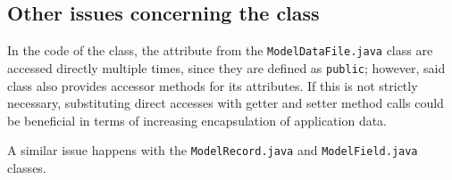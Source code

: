 
\subsection{Other issues concerning the class}
In the code of the class, the attribute from the \texttt{ModelDataFile.java} class are accessed directly multiple times, since they are defined as \texttt{public}; however, said class also provides accessor methods for its attributes. If this is not strictly necessary, substituting direct accesses with getter and setter method calls could be beneficial in terms of increasing encapsulation of application data.

A similar issue happens with the \texttt{ModelRecord.java} and \texttt{ModelField.java} classes.